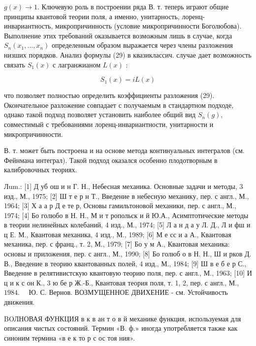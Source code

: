 \documentclass[10pt]{article}
\begin{document}
$g(x) \rightarrow 1$. Ключевую роль в построении ряда В. т. теперь играют общие принципы квантовой теории поля, а именно, унитарность, лоренц-инвариантность, микропричинность (условие микропричинности Боголюбова). Выполнение этих требований оказывается возможным лишь в случае, когда $S_{n}\left(x_{1}, \ldots, x_{n}\right)$ определенным образом выражается через члены разложения низших порядков. Анализ формулы (29) в квазиклассич. случае дает возможность связать $S_{1}(x)$ с лагранжианом $L(x)$ :



\[

S_{1}(x)=i L(x)

\]



что позволяет полностью определить коэффициенты разложения (29). Окончательное разложение совпадает с получаемым в стандартном подходе, однако такой подход позволяет установить наиболее общий вид $S_{n}(g)$, совместимый с требованиями лоренц-инвариантности, унитарности и микропричинности.



В. т. может быть построена и на основе метода континуальных интегралов (см. Фейнмана интеграл). Такой подход оказался особенно плодотворным в калибровочных теориях.



Лum.: [1] Д уб ош и н Г. Н., Небесная механика. Основные задачи и методы, 3 изд., М., 1975; [2] Ш т е р н Т., Введение в небесную механику, пер. с англ., М., 1964; [3] Х а а р Д е те р, Основы гамильтоновой механики, пер. с англ., М., 1974; [4] Бо голюбо в Н. Н., М и т ропольск и й Ю.А., Асимптотические методы в теории нелинейных колебаний, 4 изд., М., 1974; [5] Л а н д а у Л. Д., Л и фш и ц Е. М., Квантовая механика, 4 изд., М., 1989; [6] М е сс и а А., Квантовая механика, пер. с франц., т. 2, М., 1979; [7] Бо у м А., Квантовая механика: основы и приложения, пер. с англ., М., 1990; [8] Бо голюб о в Н. Н., Ш и рков Д. В., Введение в теорию квантованных полей, 4 изд., М., 1984; [9] Ш в е б е р С., Введение в релятивистскую квантовую теорию поля, пер. с англ., М., 1963; [10] И ц и к с он К., 3 ю бе р Ж.-Б., Квантовая теория поля, т. 1, 2, пер. с англ., М., $1984 . \quad$ Ю. С. Вернов. ВОЗМУЩЕННОЕ ДВИХЕНИЕ - см. Устойчивость движения.



BOЛНОВАЯ ФУНКЦИЯ в к в ан т о в й механике функция, используемая для описания чистых состояний. Термин «В. ф.» иногда употребляется также как синоним термина «в е к то р с ос тоя ния».
\end{document}
